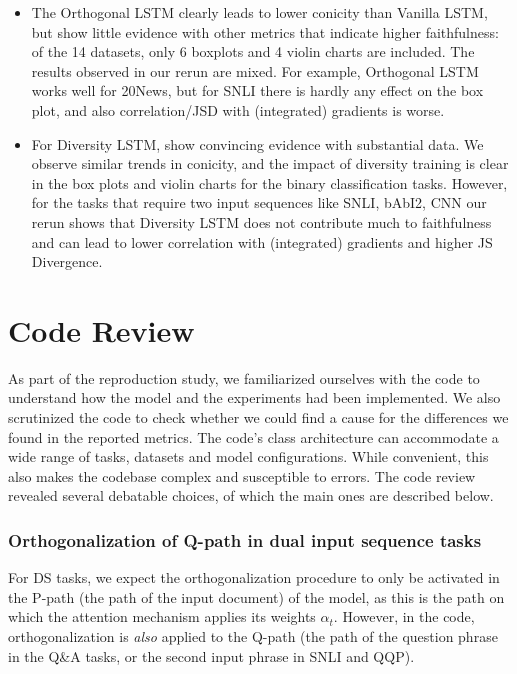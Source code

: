\begin{itemize}
\item 
The Orthogonal LSTM clearly leads to lower conicity than Vanilla LSTM, but \citet{mohankumar_towards_2020} show little evidence with other metrics that indicate higher faithfulness:  
of the 14 datasets, only 6 boxplots and 4 violin charts are included.
The results observed in our rerun are mixed. For example, Orthogonal LSTM works well for 20News, but for SNLI there is hardly any effect on the box plot, and also correlation/JSD with (integrated) gradients is worse.
\item
For Diversity LSTM, \citet{mohankumar_towards_2020} show convincing evidence with substantial data. We observe similar trends in conicity, and the impact of diversity training is clear in the box plots and violin charts for the binary classification tasks. However, for the tasks that require two input sequences like SNLI, bAbI2, CNN our rerun shows that Diversity LSTM does not contribute much to faithfulness and can lead to lower correlation with (integrated) gradients and higher JS Divergence.
\end{itemize}

\section{Code Review}

As part of the reproduction study, we familiarized ourselves with the code to understand how the model and the experiments had been implemented. We also scrutinized the code to check whether we could find a cause for the differences we found in the reported metrics.
The code's class architecture can accommodate a wide range of tasks, datasets and model configurations. While convenient, this also makes the codebase complex and susceptible to errors. 
The code review revealed several debatable choices, of which the main ones are described below.

\subsubsection{Orthogonalization of Q-path in dual input sequence tasks}

For DS tasks, we expect the orthogonalization procedure to only be activated in the P-path (the path of the input document) of the model, as this is the path on which the attention mechanism applies its weights $\alpha_t$. However, in the code, orthogonalization is \textit{also} applied to the Q-path (the path of the question phrase in the Q\&A tasks, or the second input phrase in SNLI and QQP).

